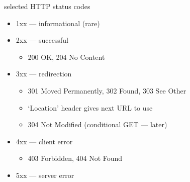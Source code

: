 \begin{frame}{selected HTTP status codes}
\begin{itemize}
\item 1xx --- informational (rare)
\item 2xx --- successful
    \begin{itemize}
    \item 200 OK, 204 No Content
    \end{itemize}
\item 3xx --- redirection
    \begin{itemize}
    \item 301 Moved Permanently, 302 Found, 303 See Other
    \item `Location' header gives next URL to use
    \item 304 Not Modified (conditional GET --- later)
    \end{itemize}
\item 4xx --- client error
    \begin{itemize}
    \item 403 Forbidden, 404 Not Found
    \end{itemize}
\item 5xx --- server error
\end{itemize}
\end{frame}
